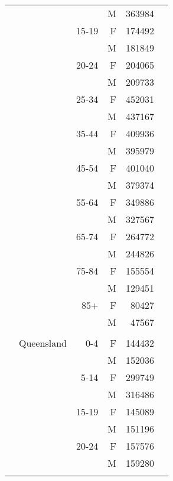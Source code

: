 \begin{tabular}{@{}c@{}rrrr@{}c@{}}
\phantom{.} &                                &        &  M &  363984 &\tabularnewline\relax 
\phantom{.} &                                &  15-19 &  F &  174492 &\tabularnewline\relax 
\phantom{.} &                                &        &  M &  181849 &\tabularnewline\relax 
\phantom{.} &                                &  20-24 &  F &  204065 &\tabularnewline\relax 
\phantom{.} &                                &        &  M &  209733 &\tabularnewline\relax 
\phantom{.} &                                &  25-34 &  F &  452031 &\tabularnewline\relax 
\phantom{.} &                                &        &  M &  437167 &\tabularnewline\relax 
\phantom{.} &                                &  35-44 &  F &  409936 &\tabularnewline\relax 
\phantom{.} &                                &        &  M &  395979 &\tabularnewline\relax 
\phantom{.} &                                &  45-54 &  F &  401040 &\tabularnewline\relax 
\phantom{.} &                                &        &  M &  379374 &\tabularnewline\relax 
\phantom{.} &                                &  55-64 &  F &  349886 &\tabularnewline\relax 
\phantom{.} &                                &        &  M &  327567 &\tabularnewline\relax 
\phantom{.} &                                &  65-74 &  F &  264772 &\tabularnewline\relax 
\phantom{.} &                                &        &  M &  244826 &\tabularnewline\relax 
\phantom{.} &                                &  75-84 &  F &  155554 &\tabularnewline\relax 
\phantom{.} &                                &        &  M &  129451 &\tabularnewline\relax 
\phantom{.} &                                &    85+ &  F &   80427 &\tabularnewline\relax 
\phantom{.} &                                &        &  M &   47567 &\tabularnewline\relax 
\phantom{.} &            &            &            &            &\tabularnewline[0.5\baselineskip]
\phantom{.} &                     Queensland &    0-4 &  F &  144432 &\tabularnewline\relax 
\phantom{.} &                                &        &  M &  152036 &\tabularnewline\relax 
\phantom{.} &                                &   5-14 &  F &  299749 &\tabularnewline\relax 
\phantom{.} &                                &        &  M &  316486 &\tabularnewline\relax 
\phantom{.} &                                &  15-19 &  F &  145089 &\tabularnewline\relax 
\phantom{.} &                                &        &  M &  151196 &\tabularnewline\relax 
\phantom{.} &                                &  20-24 &  F &  157576 &\tabularnewline\relax 
\phantom{.} &                                &        &  M &  159280 &\tabularnewline\relax 

\end{tabular}
